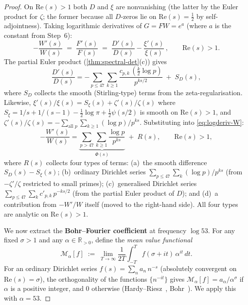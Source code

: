 \documentclass[11pt,a4paper]{article}
\theoremstyle{plain}
\theoremstyle{remark}
\newcommand{\R}{\mathbb{R}}
\begin{document}
\begin{proof}
On $\mathrm{Re}(s)>1$ both $D$ and $\xi$ are nonvanishing (the latter
by the Euler product for $\zeta$; the former because all $D$-zeros lie
on $\mathrm{Re}(s)=\frac{1}{2}$ by self-adjointness).
Taking logarithmic derivatives of $G=FW=e^a$ (where $a$ is the
constant from Step~6):
\begin{equation}\label{eq:logderiv-W}
  -\frac{W'(s)}{W(s)}
  \;=\; \frac{F'(s)}{F(s)}
  \;=\; \frac{D'(s)}{D(s)} - \frac{\xi'(s)}{\xi(s)}\,,
  \qquad \mathrm{Re}(s)>1.
\end{equation}
The partial Euler product (\cref{thm:spectral-det}(c)) gives
\[
  \frac{D'(s)}{D(s)}
  = -\sum_{p\leq 47}\sum_{k\geq 1}
    \frac{c_{p,k}\,(\tfrac{k}{2}\log p)}{p^{ks/2}}
  \;+\; S_D(s),
\]
where $S_D$ collects the smooth (Stirling-type) terms from the
zeta-regularisation.  Likewise,
$\xi'(s)/\xi(s) = S_\xi(s) + \zeta'(s)/\zeta(s)$ where
$S_\xi = 1/s + 1/(s{-}1) - \tfrac{1}{2}\log\pi + \tfrac{1}{2}\psi(s/2)$
is smooth on $\mathrm{Re}(s)>1$, and
$\zeta'(s)/\zeta(s) = -\sum_{\text{all }p}\sum_{k\geq 1}
(\log p)/p^{ks}$.
Substituting into \cref{eq:logderiv-W}:
\begin{equation}\label{eq:W-dirichlet}
  -\frac{W'(s)}{W(s)}
  = \underbrace{\sum_{p>47}\sum_{k\geq 1}
    \frac{\log p}{p^{ks}}}_{\displaystyle\Phi(s)}
  \;+\; R(s),
  \qquad \mathrm{Re}(s)>1,
\end{equation}
where $R(s)$ collects four types of terms: (a)~the smooth difference
$S_D(s)-S_\xi(s)$; (b)~ordinary Dirichlet series
$\sum_{p\leq 47}\sum_k (\log p)/p^{ks}$ (from $-\zeta'/\zeta$
restricted to small primes); (c)~generalised Dirichlet series
$\sum_{p\leq 47}\sum_k c'_{p,k}\,p^{-ks/2}$ (from the partial Euler
product of $D$); and (d)~a contribution from $-W'/W$ itself (moved to the right-hand side).  All four types are analytic on $\mathrm{Re}(s)>1$.

We now extract the \textbf{Bohr--Fourier coefficient} at
frequency $\log 53$.  For any fixed $\sigma>1$ and any
$\alpha\in\R_{>0}$, define the \emph{mean value functional}
\begin{equation}\label{eq:mean-value}
  \mathcal{M}_\alpha[f]
  \;:=\;
  \lim_{T\to\infty}\frac{1}{2T}
  \int_{-T}^{T} f(\sigma+it)\,\alpha^{it}\,dt.
\end{equation}
For an ordinary Dirichlet series
$f(s) = \sum_n a_n\,n^{-s}$ (absolutely convergent
on $\mathrm{Re}(s)=\sigma$), the
orthogonality of the functions $\{n^{-it}\}$ gives
$\mathcal{M}_\alpha[f] = a_\alpha/\alpha^\sigma$
if $\alpha$ is a positive integer, and $0$ otherwise
(Hardy--Riesz~\cite{hardy-riesz1915},
Bohr~\cite{bohr1913}).  We apply this with $\alpha = 53$.


\end{proof}
\end{document}
